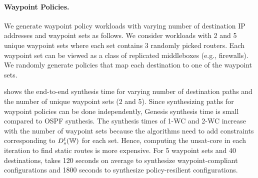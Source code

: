 \begin{figure}
	\begin{center}
	\end{center} 
\end{figure}
\paragraph{Waypoint Policies.}
We generate waypoint policy 
workloads with varying number of destination IP addresses and 
waypoint sets as follows. 
We consider workloads with 2 and 5 unique waypoint 
sets where each set contains 3 randomly picked routers.  
Each waypoint set can be 
viewed as a class of replicated middleboxes (e.g., firewalls).
We randomly generate policies that map each destination to one of the waypoint sets. 


 shows the end-to-end synthesis
 time for varying number of destination paths and the 
 number of unique waypoint sets (2 and 5). 
 Since synthesizing paths
 for waypoint policies can be done independently,
Genesis synthesis time is small compared to OSPF synthesis. 
The synthesis times of 1-WC and 2-WC 
increase with the number of waypoint sets because
the algorithms 
need to add constraints corresponding to $D_s^t(\mathbb{W})$ 
for each set. Hence, computing the unsat-core in each
iteration to find static routes is more expensive. 
For 5 waypoint sets and 40 destinations, \name takes 120 
seconds on average to synthesize waypoint-compliant configurations
and 1800 seconds to synthesize policy-resilient configurations.


